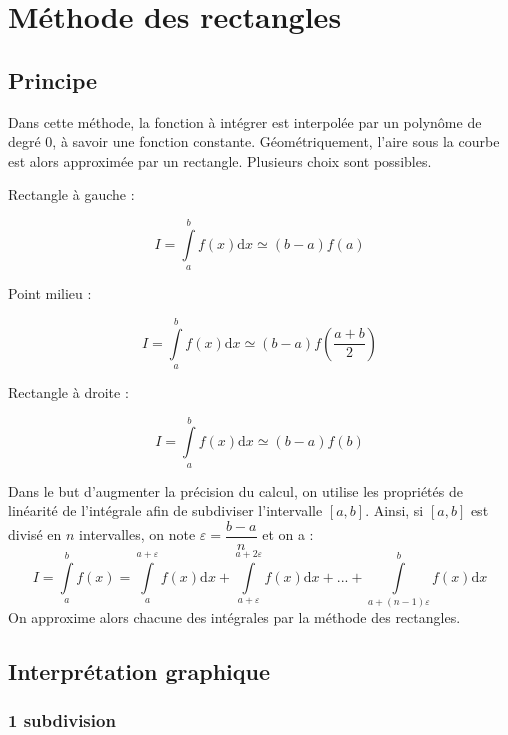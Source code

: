 \documentclass[11pt]{article}
\begin{document}
\section{Méthode des rectangles}
\subsection{Principe}
\begin{defi}
Dans cette méthode, la fonction à intégrer est interpolée par un polynôme de degré 0, à savoir une fonction constante. Géométriquement, l'aire sous la courbe est alors approximée par un rectangle. Plusieurs choix sont possibles.

\begin{minipage}[c]{.3\linewidth}
Rectangle à gauche :

$$
I = \int\limits_a^{b} f(x) \mathrm{d}x \simeq \left(b-a\right) f(a) 
$$
\end{minipage}\hfill
\begin{minipage}[c]{.3\linewidth}
Point milieu :

$$
I = \int\limits_a^{b} f(x) \mathrm{d}x \simeq \left(b-a\right) f\left(\dfrac{a+b}{2}\right) 
$$
\end{minipage}\hfill
\begin{minipage}[c]{.3\linewidth}
Rectangle à droite :

$$
I = \int\limits_a^{b} f(x) \mathrm{d}x \simeq \left(b-a\right) f(b) 
$$
\end{minipage}

\end{defi}

\begin{rem}
Dans le but d'augmenter la précision du calcul, on utilise les propriétés de linéarité de l'intégrale afin de subdiviser l'intervalle $[a,b]$. Ainsi, si $[a,b]$ est divisé en $n$ intervalles, on note $\varepsilon=\dfrac{b-a}{n}$ et on a :  
$$
I= \int\limits_a^{b} f(x) = \int\limits_{a}^{a+\varepsilon} f(x) \mathrm{d}x + \int\limits_{a+\varepsilon}^{a+2\varepsilon} f(x) \mathrm{d}x + ... + \int\limits_{a+(n-1)\varepsilon}^{b} f(x) \mathrm{d}x
$$
On approxime alors chacune des intégrales par la méthode des rectangles.
\end{rem}
\subsection{Interprétation graphique}

\subsubsection*{1 subdivision}
\end{document}
